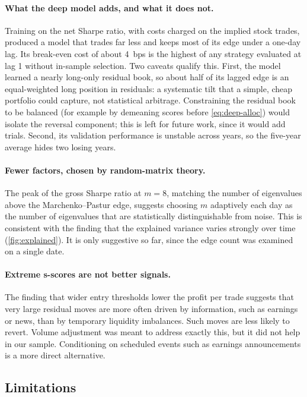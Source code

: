 \paragraph{What the deep model adds, and what it does not.}
Training on the net Sharpe ratio, with costs charged on the implied stock trades, produced a model
that trades far less and keeps most of its edge under a one-day lag. Its break-even cost of about
4~bps is the highest of any strategy evaluated at lag 1 without in-sample selection. Two caveats
qualify this. First, the model learned a nearly long-only residual book, so about half of its
lagged edge is an equal-weighted long position in residuals: a systematic tilt that a simple,
cheap portfolio could capture, not statistical arbitrage. Constraining the residual book to be
balanced (for example by demeaning scores before \cref{eq:deep-alloc}) would isolate the reversal
component; this is left for future work, since it would add trials. Second, its validation
performance is unstable across years, so the five-year average hides two losing years.

\paragraph{Fewer factors, chosen by random-matrix theory.}
The peak of the gross Sharpe ratio at $m=8$, matching the number of eigenvalues above the
Marchenko--Pastur edge, suggests choosing $m$ adaptively each day as the number of
eigenvalues that are statistically distinguishable from noise. This is consistent with the
finding that the explained variance varies strongly over time (\cref{fig:explained}). It is
only suggestive so far, since the edge count was examined on a single date.

\paragraph{Extreme s-scores are not better signals.}
The finding that wider entry thresholds lower the profit per trade suggests that very large
residual moves are more often driven by information, such as earnings or news, than by
temporary liquidity imbalances. Such moves are less likely to revert. Volume adjustment was
meant to address exactly this, but it did not help in our sample. Conditioning on scheduled
events such as earnings announcements is a more direct alternative.

\subsection{Limitations}
\label{sec:limitations}

